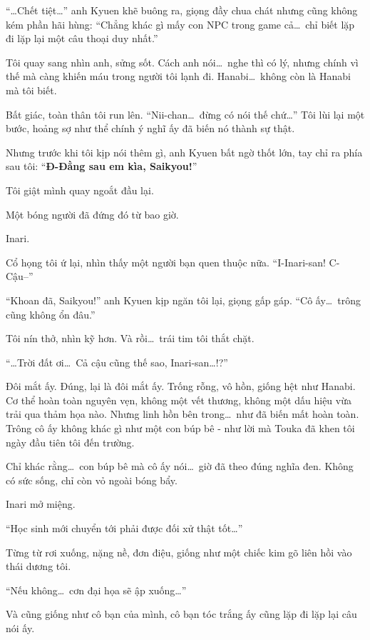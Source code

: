 \documentclass[../main.tex]{subfiles}
\begin{document}
``\dots Chết tiệt\dots'' anh Kyuen khẽ buông ra, giọng đầy chua chát nhưng cũng không kém phần hãi hùng: ``Chẳng khác gì mấy con NPC trong game cả\dots\ chỉ biết lặp đi lặp lại một câu thoại duy nhất.''

Tôi quay sang nhìn anh, sửng sốt. Cách anh nói\dots\ nghe thì có lý, nhưng chính vì thế mà càng khiến máu trong người tôi lạnh đi. Hanabi\dots\ không còn là Hanabi mà tôi biết.

Bất giác, toàn thân tôi run lên. ``Nii-chan\dots\ đừng có nói thế chứ\dots'' Tôi lùi lại một bước, hoảng sợ như thể chính ý nghĩ ấy đã biến nó thành sự thật.

Nhưng trước khi tôi kịp nói thêm gì, anh Kyuen bất ngờ thốt lớn, tay chỉ ra phía sau tôi: ``\textbf{Đ-Đằng sau em kìa, Saikyou!}''

Tôi giật mình quay ngoắt đầu lại.

Một bóng người đã đứng đó từ bao giờ.


Inari.

Cổ họng tôi ứ lại, nhìn thấy một người bạn quen thuộc nữa. ``I-Inari-san! C-Cậu--''

``Khoan đã, Saikyou!'' anh Kyuen kịp ngăn tôi lại, giọng gấp gáp. ``Cô ấy\dots\ trông cũng không ổn đâu.''

Tôi nín thở, nhìn kỹ hơn. Và rồi\dots\ trái tim tôi thắt chặt.

``\dots Trời đất ơi\dots\ Cả cậu cũng thế sao, Inari-san\dots!?''

Đôi mắt ấy. Đúng, lại là đôi mắt ấy. Trống rỗng, vô hồn, giống hệt như Hanabi. Cơ thể hoàn toàn nguyên vẹn, không một vết thương, không một dấu hiệu vừa trải qua thảm họa nào. Nhưng linh hồn bên trong\dots\ như đã biến mất hoàn toàn. Trông cô ấy không khác gì như một con búp bê - như lời mà Touka đã khen tôi ngày đầu tiên tôi đến trường.

Chỉ khác rằng\dots\ con búp bê mà cô ấy nói\dots\ giờ đã theo đúng nghĩa đen. Không có sức sống, chỉ còn vỏ ngoài bóng bẩy.

Inari mở miệng.

``Học sinh mới chuyển tới phải được đối xử thật tốt\dots''

Từng từ rơi xuống, nặng nề, đơn điệu, giống như một chiếc kim gõ liên hồi vào thái dương tôi.

``Nếu không\dots\ cơn đại họa sẽ ập xuống\dots''

Và cũng giống như cô bạn của mình, cô bạn tóc trắng ấy cũng lặp đi lặp lại câu nói ấy.
\end{document}
